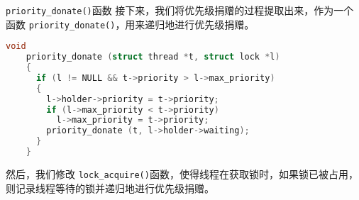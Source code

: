 \documentclass{beamer}
\begin{document}
\begin{frame}




  \begin{block}{\texttt{priority\_donate()}函数}
    接下来，我们将优先级捐赠的过程提取出来，作为一个函数 \texttt{priority\_donate()}，用来递归地进行优先级捐赠。
  \end{block}


  \begin{lstlisting}[language=C, title=优先级捐赠函数]
    void
    priority_donate (struct thread *t, struct lock *l)
    {
      if (l != NULL && t->priority > l->max_priority)
      {
        l->holder->priority = t->priority;
        if (l->max_priority < t->priority)
          l->max_priority = t->priority;
        priority_donate (t, l->holder->waiting);
      }
    }

\end{lstlisting}

  然后，我们修改 \texttt{lock\_acquire()}函数，使得线程在获取锁时，如果锁已被占用，则记录线程等待的锁并递归地进行优先级捐赠。

    
    
    

\end{frame}
\end{document}
